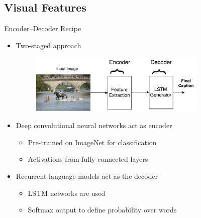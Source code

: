 \documentclass{beamer}
\begin{document}
\subsection{Visual Features}
\begin{frame}{Encoder--Decoder Recipe}
\begin{itemize}
\item Two-staged approach
    {
        \begin{figure}[h]
            \centering
            \includegraphics[width=0.8\textwidth]{images/EncDec.pdf}
        \end{figure}
     }
\item Deep convolutional neural networks act as encoder
    \begin{itemize}
        \item Pre-trained on ImageNet for classification 
        \item Activations from fully connected layers
    \end{itemize}
\item Recurrent language models act as the decoder 
    \begin{itemize}    
        \item LSTM networks are used
        \item Softmax output to define probability over words 
    \end{itemize}
\end{itemize} 
\end{frame}
\end{document}
